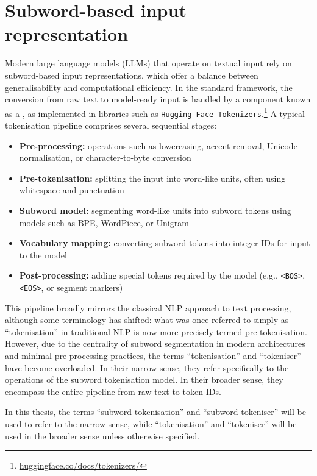 \section{Subword-based input representation}\label{sec:12-subword}

Modern large language models (LLMs) that operate on textual input rely on subword-based input representations, which offer a balance between generalisability and computational efficiency. In the standard framework, the conversion from raw text to model-ready input is handled by a component known as a , as implemented in libraries such as \texttt{Hugging Face Tokenizers}.\footnote{\href{https://huggingface.co/docs/tokenizers/index}{huggingface.co/docs/tokenizers/}} A typical tokenisation pipeline comprises several sequential stages:

\begin{itemize}
\item \textbf{Pre-processing:} operations such as lowercasing, accent removal, Unicode normalisation, or character-to-byte conversion
\item \textbf{Pre-tokenisation:} splitting the input into word-like units, often using whitespace and punctuation
\item \textbf{Subword model:} segmenting word-like units into subword tokens using models such as BPE, WordPiece, or Unigram
\item \textbf{Vocabulary mapping:} converting subword tokens into integer IDs for input to the model
\item \textbf{Post-processing:} adding special tokens required by the model (e.g., \texttt{<BOS>}, \texttt{<EOS>}, or segment markers)
\end{itemize}

This pipeline broadly mirrors the classical NLP approach to text processing, although some terminology has shifted: what was once referred to simply as “tokenisation” in traditional NLP is now more precisely termed pre-tokenisation. However, due to the centrality of subword segmentation in modern architectures and minimal pre-processing practices, the terms “tokenisation” and “tokeniser” have become overloaded. In their narrow sense, they refer specifically to the operations of the subword tokenisation model. In their broader sense, they encompass the entire pipeline from raw text to token IDs.

In this thesis, the terms “subword tokenisation” and “subword tokeniser” will be used to refer to the narrow sense, while “tokenisation” and “tokeniser” will be used in the broader sense unless otherwise specified.

